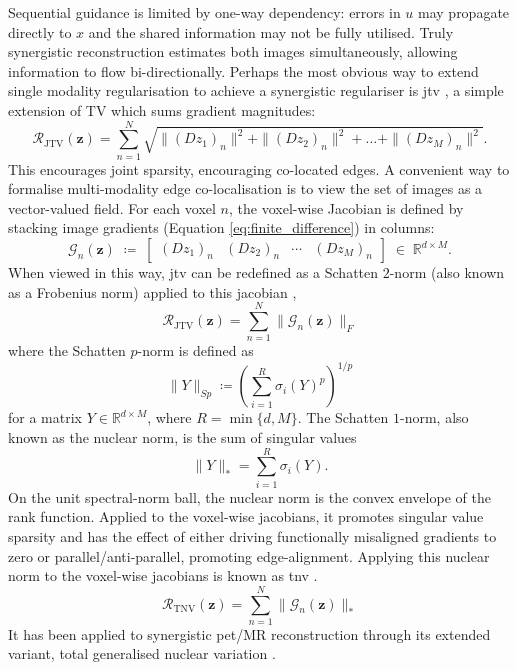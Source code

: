 Sequential guidance is limited by one-way dependency: errors in $u$ may propagate directly to $x$ and the shared information may not be fully utilised. Truly synergistic reconstruction estimates both images simultaneously, allowing information to flow bi-directionally. Perhaps the most obvious way to extend single modality regularisation to achieve a synergistic regulariser is \gls{jtv} \cite{blomgrenColorTVTotal1998}, a simple extension of TV which sums gradient magnitudes:
\begin{equation}
    \mathcal{R}_{\mathrm{JTV}}(\bm{z}) = \sum_{n=1}^N \sqrt{ \|(D z_1)_n\|^2 + \|(D z_2)_n\|^2 + \dots +\|(D z_M)_n\|^2 }.
\end{equation}
This encourages joint sparsity, encouraging co-located edges. A convenient way to formalise multi-modality edge co-localisation is to view the set of images as a vector-valued field.  For each voxel $n$, the voxel-wise Jacobian is defined by stacking image gradients (Equation \ref{eq:finite_difference}) in columns:
\begin{equation}\label{eq:jacobian}
\mathcal{G}_n(\bm{z})
\;\coloneqq\;
\begin{bmatrix}
(D z_1)_n & (D z_2)_n & \cdots & (D z_M)_n
\end{bmatrix}
\;\in\; \mathbb{R}^{d\times M}.
\end{equation}
When viewed in this way, \gls{jtv} can be redefined as a Schatten $2$-norm (also known as a Frobenius norm) applied to this jacobian \cite{holtTotalNuclearVariation2014},
\begin{equation}\label{eq:jtv}
    \mathcal{R}_{\mathrm{JTV}}(\bm{z}) = \sum_{n=1}^N  \|\mathcal{G}_n(\bm{z})\|_F
\end{equation}
where the Schatten $p$-norm is defined as
\begin{equation}\label{eq:schatten}
    \|Y\|_{Sp} \coloneqq \left(\sum_{i=1}^{R}\sigma_i(Y)^p\right)^{1/p}
\end{equation}
for a matrix $Y\in\mathbb{R}^{d\times M}$, where $R=\min\{d,M\}$. The Schatten $1$-norm, also known as the nuclear norm, is the sum of singular values
\begin{equation}
    \|Y\|_* = \sum_{i=1}^{R}\sigma_i(Y).
\end{equation}
On the unit spectral-norm ball, the nuclear norm is the convex envelope of the rank function. Applied to the voxel-wise jacobians, it promotes singular value sparsity and has the effect of either driving functionally misaligned gradients to zero or parallel/anti-parallel, promoting edge-alignment. Applying this nuclear norm to the voxel-wise jacobians is known as \gls{tnv} \cite{holtTotalNuclearVariation2014, rigieJointReconstructionMultichannel2015}.
\begin{equation}\label{eq:tnv}
    \mathcal{R}_{\mathrm{TNV}}(\bm{z}) = \sum_{n=1}^N  \|\mathcal{G}_n(\bm{z})\|_*
\end{equation}
It has been applied to synergistic \gls{pet}/MR reconstruction through its extended variant, total generalised nuclear variation \cite{knollJointMRPETReconstruction2017}.

